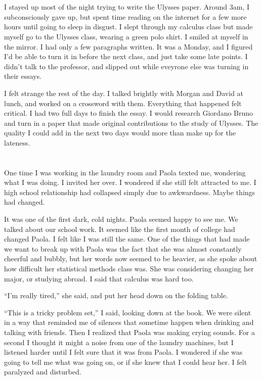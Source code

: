 \section{}

I stayed up most of the night trying to write the Ulysses paper.   Around 3am, I
subconsciously gave up, but spent time reading on the internet for a few more
hours until going to sleep in disgust.  I slept through my calculus class but
made myself go to the Ulysses class, wearing a green polo shirt.  I smiled at
myself in the mirror.  I had only a few paragraphs written.  It was a Monday,
and I figured I'd be able to turn it in before the next class, and just take
some late points.  I didn't talk to the professor, and slipped out while
eveyrone else was turning in their essays.  

I felt strange the rest of the day.  I talked brightly with Morgan and David at
lunch, and worked on a crossword with them.  Everything that happened felt
critical.  I had two full days to finish the essay.  I would research Giordano
Bruno and turn in a paper that made original contributions to the study of
Ulysses. The quality I could add in the next two days would more than make up
for the lateness.  

\section{} 

One time I was working in the laundry room and Paola texted me, wondering what I
was doing.  I invited her over.  I wondered if she still felt attracted to me.
I high school relationship had collapsed simply due to awkwardness.  Maybe
things had changed.  

It was one of the first dark, cold nights.  Paola seemed happy to see me.  We
talked about our school work.  It seemed like the first month of college had
changed Paola.  I felt like I was still the same.  One of the things that had
made we want to break up with Paola was the fact that she was almost constantly
cheerful and bubbly, but her words now seemed to be heavier, as she spoke about
how difficult her statistical methods class was.  She was considering changing
her major, or studying abroad.  I said that calculus was hard too. 

``I'm really tired,'' she said, and put her head down on the folding table.

``This is a tricky problem set,'' I said, looking down at the book.  We were
silent in a way that reminded me of silences that sometime happen when drinking
and talking with friends. Then I realized that Paola was making crying sounds.
For a second I thought it might a noise from one of the laundry machines, but I
listened harder until I felt sure that it was from Paola.  I wondered if she
was going to tell me what was going on, or if she knew that I could hear her.
I felt paralyzed and disturbed.  

